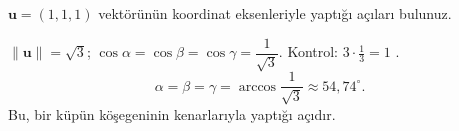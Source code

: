 \begin{soru}
$\mathbf u=(1,1,1)$ vektörünün koordinat eksenleriyle yaptığı açıları bulunuz.
\end{soru}
\begin{cevap}
$\|\mathbf u\|=\sqrt3$; $\cos\alpha=\cos\beta=\cos\gamma=\dfrac{1}{\sqrt3}$. Kontrol: $3\cdot\frac13=1$ \checkmark.
\[
\alpha=\beta=\gamma=\arccos\frac{1}{\sqrt3}\approx54{,}74^\circ .
\]
Bu, bir küpün köşegeninin kenarlarıyla yaptığı açıdır.
\end{cevap}
